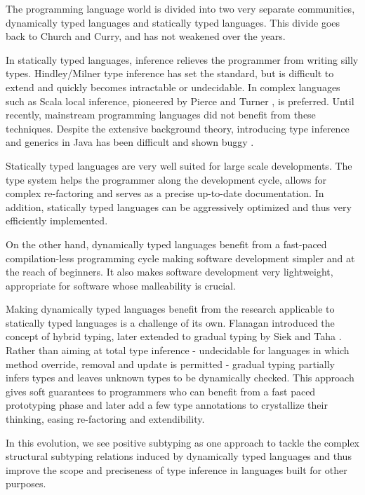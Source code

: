\documentclass{report}
\begin{document}
  The programming language world is divided into two very separate communities,
  dynamically typed languages and statically typed languages. This divide
  goes back to Church and Curry, and has not weakened over the years.
  
  In statically typed languages, inference relieves the programmer
  from writing silly types. Hindley/Milner type inference has set the standard,
  but is difficult to extend and quickly becomes intractable or undecidable.
  In complex languages
  such as Scala \cite{scala} local inference, pioneered by Pierce and Turner
  \cite{PierceTurner:LTI}, is preferred. Until recently,
  mainstream programming languages did not benefit from these techniques.
  Despite the extensive background theory, introducing type inference and generics
  in Java \cite{bracha98making,java4} has been difficult and shown  buggy \cite{nominaltyping}.
  
  Statically typed languages are very well suited for large scale developments.
  The type system helps the programmer along the development cycle, allows
  for complex re-factoring and serves as a precise up-to-date documentation.
  In addition, statically typed languages can be aggressively optimized and
  thus very efficiently implemented.
  
  On the other hand, dynamically typed languages benefit from a fast-paced
  compilation-less programming cycle making software development
  simpler and at the reach of beginners. It also makes software development very
  lightweight, appropriate for software whose malleability is crucial.
  
  Making dynamically typed languages benefit from the research applicable to
  statically typed languages is a challenge of its own. Flanagan \cite{hybrid}
  introduced the concept of hybrid typing, later extended to gradual typing
  by Siek and Taha \cite{gradual}. Rather than aiming at total type inference - undecidable
  for languages in which method override, removal and update is permitted -
  gradual typing partially infers types and leaves unknown types to
  be dynamically checked. This approach gives soft guarantees to programmers
  who can benefit from a fast paced prototyping phase and later add a few
  type annotations to crystallize their thinking, easing re-factoring and
  extendibility.
  
  In this evolution, we see positive subtyping as one approach to tackle
  the complex structural subtyping relations induced by dynamically typed
  languages and thus improve the scope and preciseness of type inference
  in languages built for other purposes.
  
\end{document}

